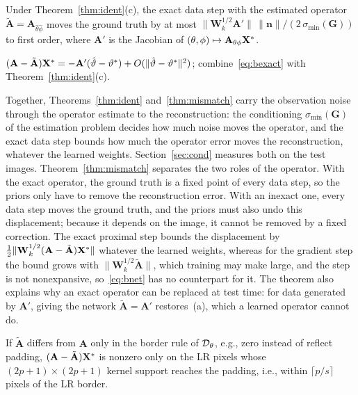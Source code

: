 \documentclass[journal]{IEEEtran}
\begin{document}
\begin{corollary}
\label{cor:chain}
Under Theorem~\ref{thm:ident}(c), the exact data step with the estimated operator $\tilde{\mathbf{A}}=\mathbf{A}_{\hat\theta\hat\phi}$ moves the ground truth by at most $\|\mathbf{W}_k^{1/2}\mathbf{A}'\|\,\|\mathbf{n}\|/(2\,\sigma_{\min}(\mathbf{G}))$ to first order, where $\mathbf{A}'$ is the Jacobian of $(\theta,\phi)\mapsto\mathbf{A}_{\theta\phi}\mathbf{X}^*$.
\end{corollary}
\begin{IEEEproof}
$(\mathbf{A}-\tilde{\mathbf{A}})\mathbf{X}^*=-\mathbf{A}'(\hat\vartheta-\vartheta^*)+O(\|\hat\vartheta-\vartheta^*\|^2)$; combine~\eqref{eq:bexact} with Theorem~\ref{thm:ident}(c).
\end{IEEEproof}
Together, Theorems~\ref{thm:ident} and~\ref{thm:mismatch} carry the observation noise through the operator estimate to the reconstruction: the conditioning $\sigma_{\min}(\mathbf{G})$ of the estimation problem decides how much noise moves the operator, and the exact data step bounds how much the operator error moves the reconstruction, whatever the learned weights. Section~\ref{sec:cond} measures both on the test images.
Theorem~\ref{thm:mismatch} separates the two roles of the operator. With the exact operator, the ground truth is a fixed point of every data step, so the priors only have to remove the reconstruction error. With an inexact one, every data step moves the ground truth, and the priors must also undo this displacement; because it depends on the image, it cannot be removed by a fixed correction. The exact proximal step bounds the displacement by $\tfrac12\|\mathbf{W}_k^{1/2}(\mathbf{A}-\tilde{\mathbf{A}})\mathbf{X}^*\|$ whatever the learned weights, whereas for the gradient step the bound grows with $\|\mathbf{W}_k^{1/2}\tilde{\mathbf{A}}\|$, which training may make large, and the step is not nonexpansive, so~\eqref{eq:bnet} has no counterpart for it. The theorem also explains why an exact operator can be replaced at test time: for data generated by $\mathbf{A}'$, giving the network $\tilde{\mathbf{A}}=\mathbf{A}'$ restores~(a), which a learned operator cannot do.
\begin{corollary}
\label{cor:border}
If $\tilde{\mathbf{A}}$ differs from $\mathbf{A}$ only in the border rule of $\mathcal{D}_\theta$, e.g., zero instead of reflect padding, $(\mathbf{A}-\tilde{\mathbf{A}})\mathbf{X}^*$ is nonzero only on the LR pixels whose $(2p+1)\times(2p+1)$ kernel support reaches the padding, i.e., within $\lceil p/s\rceil$ pixels of the LR border.
\end{corollary}
\end{document}
